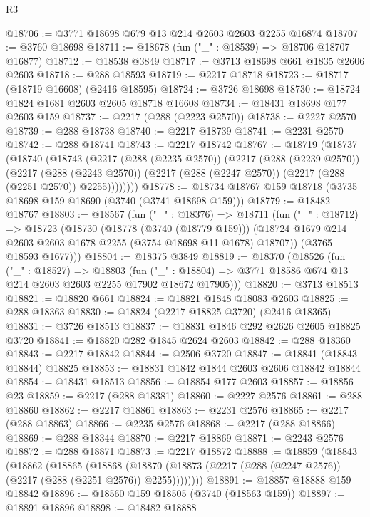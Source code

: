 \begin{lexlean}{R3}
\begin{coremodule}
@18706 := @3771 @18698 @679 @13 @214 @2603 @2603 @2255 @16874
@18707 := @3760 @18698
@18711 := @18678 (fun ("_" : @18539) => @18706 @18707 @16877)
@18712 := @18538 @3849
@18717 := @3713 @18698 @661 @1835 @2606 @2603
@18718 := @288 @18593
@18719 := @2217 @18718
@18723 := @18717 (@18719 @16608) (@2416 @18595)
@18724 := @3726 @18698
@18730 := @18724 @1824 @1681 @2603 @2605 @18718 @16608
@18734 := @18431 @18698 @177 @2603 @159
@18737 := @2217 (@288 (@2223 @2570))
@18738 := @2227 @2570
@18739 := @288 @18738
@18740 := @2217 @18739
@18741 := @2231 @2570
@18742 := @288 @18741
@18743 := @2217 @18742
@18767 := @18719
    (@18737
      (@18740
        (@18743
          (@2217
            (@288 (@2235 @2570))
            (@2217
              (@288 (@2239 @2570))
              (@2217
                (@288 (@2243 @2570))
                (@2217 (@288 (@2247 @2570)) (@2217 (@288 (@2251 @2570)) @2255))))))))
@18778 := @18734 @18767 @159 @18718 (@3735 @18698 @159 @18690 (@3740 (@3741 @18698 @159)))
@18779 := @18482 @18767
@18803 := @18567
    (fun ("_" : @18376) =>
    @18711
      (fun ("_" : @18712) =>
      @18723
        (@18730
          (@18778 (@3740 (@18779 @159)))
          (@18724 @1679 @214 @2603 @2603 @1678 @2255 (@3754 @18698 @11 @1678) @18707))
        (@3765 @18593 @1677)))
@18804 := @18375 @3849
@18819 := @18370
    (@18526
      (fun ("_" : @18527) =>
      @18803
        (fun ("_" : @18804) => @3771 @18586 @674 @13 @214 @2603 @2603 @2255 @17902 @18672 @17905)))
@18820 := @3713 @18513
@18821 := @18820 @661
@18824 := @18821 @1848 @18083 @2603
@18825 := @288 @18363
@18830 := @18824 (@2217 @18825 @3720) (@2416 @18365)
@18831 := @3726 @18513
@18837 := @18831 @1846 @292 @2626 @2605 @18825 @3720
@18841 := @18820 @282 @1845 @2624 @2603
@18842 := @288 @18360
@18843 := @2217 @18842
@18844 := @2506 @3720
@18847 := @18841 (@18843 @18844) @18825
@18853 := @18831 @1842 @1844 @2603 @2606 @18842 @18844
@18854 := @18431 @18513
@18856 := @18854 @177 @2603
@18857 := @18856 @23
@18859 := @2217 (@288 @18381)
@18860 := @2227 @2576
@18861 := @288 @18860
@18862 := @2217 @18861
@18863 := @2231 @2576
@18865 := @2217 (@288 @18863)
@18866 := @2235 @2576
@18868 := @2217 (@288 @18866)
@18869 := @288 @18344
@18870 := @2217 @18869
@18871 := @2243 @2576
@18872 := @288 @18871
@18873 := @2217 @18872
@18888 := @18859
    (@18843
      (@18862
        (@18865
          (@18868
            (@18870 (@18873 (@2217 (@288 (@2247 @2576)) (@2217 (@288 (@2251 @2576)) @2255))))))))
@18891 := @18857 @18888 @159 @18842
@18896 := @18560 @159 @18505 (@3740 (@18563 @159))
@18897 := @18891 @18896
@18898 := @18482 @18888

\end{coremodule}
\end{lexlean}

